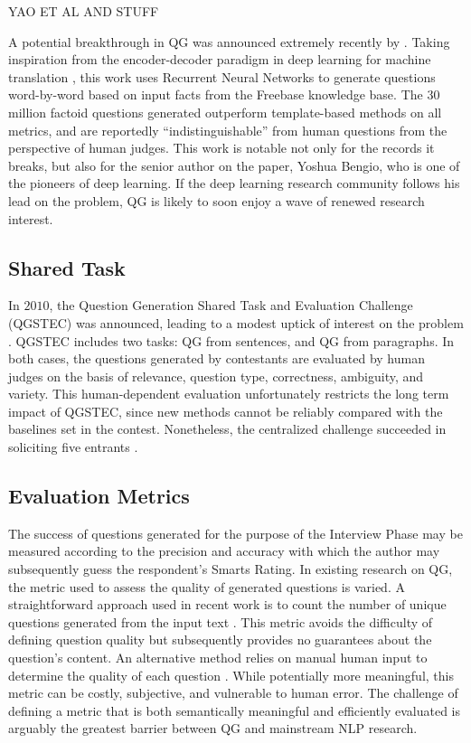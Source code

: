 
YAO ET AL AND STUFF

A potential breakthrough in QG was announced extremely recently by \citet{1603.06807}. Taking inspiration from the encoder-decoder paradigm in deep learning for machine translation \citep{cho2014learning}, this work uses Recurrent Neural Networks to generate questions word-by-word based on input facts from the Freebase knowledge base. The 30 million factoid questions generated outperform template-based methods on all metrics, and are reportedly ``indistinguishable'' from human questions from the perspective of human judges. This work is notable not only for the records it breaks, but also for the senior author on the paper, Yoshua Bengio, who is one of the pioneers of deep learning. If the deep learning research community follows his lead on the problem, QG is likely to soon enjoy a wave of renewed research interest.

\subsection{Shared Task}

In $2010$, the Question Generation Shared Task and Evaluation Challenge (QGSTEC) was announced, leading to a modest uptick of interest on the problem \citep{rus2011question}. QGSTEC includes two tasks: QG from sentences, and QG from paragraphs. In both cases, the questions generated by contestants are evaluated by human judges on the basis of relevance, question type, correctness, ambiguity, and variety. This human-dependent evaluation unfortunately restricts the long term impact of QGSTEC, since new methods cannot be reliably compared with the baselines set in the contest. Nonetheless, the centralized challenge succeeded in soliciting five entrants \citep{ali2010automatic,pal2010qgstec,yao2010question, vargaha, mannem2010question}. 

\subsection{Evaluation Metrics}

The success of questions generated for the purpose of the Interview Phase may be measured according to the precision and accuracy with which the author may subsequently guess the respondent's Smarts Rating. In existing research on QG, the metric used to assess the quality of generated questions is varied. A straightforward approach used in recent work is to count the number of unique questions generated from the input text \citep{ali2010automatic}. This metric avoids the difficulty of defining question quality but subsequently provides no guarantees about the question's content. An alternative method relies on manual human input to determine the quality of each question \citep{rus2011question, heilman2011automatic}. While potentially more meaningful, this metric can be costly, subjective, and vulnerable to human error. The challenge of defining a metric that is both semantically meaningful and efficiently evaluated is arguably the greatest barrier between QG and mainstream NLP research.

